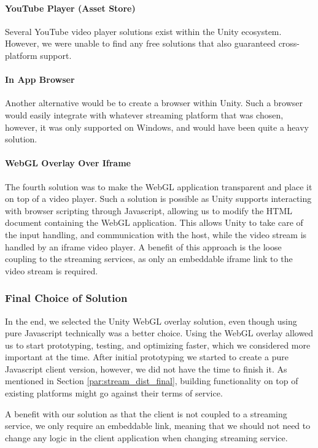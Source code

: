 \paragraph{YouTube Player (Asset Store)}
Several YouTube video player solutions exist within the Unity ecosystem. However, we were unable to find any free solutions that also guaranteed cross-platform support. 

\paragraph{In App Browser}
Another alternative would be to create a browser within Unity\cite{unity_simple_browser}. Such a browser would easily integrate with whatever streaming platform that was chosen, however, it was only supported on Windows, and would have been quite a heavy solution.

\paragraph{WebGL Overlay Over Iframe}
The fourth solution was to make the WebGL application transparent and place it on top of a video player. Such a solution is possible as Unity supports interacting with browser scripting through Javascript\cite{unity_webgl_javascript_interaction}, allowing us to modify the HTML document containing the WebGL application. 
This allows Unity to take care of the input handling, and communication with the host, while the video stream is handled by an iframe video player. A benefit of this approach is the loose coupling to the streaming services, as only an embeddable iframe link to the video stream is required.

\subsubsection{Final Choice of Solution}
\label{par:client_final}
In the end, we selected the Unity WebGL overlay solution, even though using pure Javascript technically was a better choice. Using the WebGL overlay allowed us to start prototyping, testing, and optimizing faster, which we considered more important at the time. After initial prototyping we started to create a pure Javascript client version, however, we did not have the time to finish it. 
As mentioned in Section \ref{par:stream_dist_final}, building functionality on top of existing platforms might go against their terms of service. 

A benefit with our solution as that the client is not coupled to a streaming service, we only require an embeddable link, meaning that we should not need to change any logic in the client application when changing streaming service.
